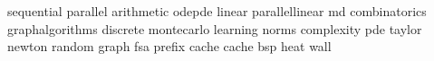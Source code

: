 sequential
parallel
arithmetic
odepde
linear
parallellinear
md
combinatorics
graphalgorithms
discrete
montecarlo
learning
norms
complexity
pde
taylor
newton
random
graph
fsa
prefix
cache
cache
bsp
heat
wall
